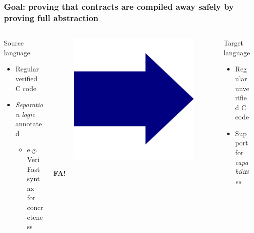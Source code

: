 \documentclass{beamer}
\begin{document}
\begin{frame}
\frametitle{Goal: proving that contracts are compiled away safely by proving full abstraction}
\begin{columns}%
\begin{column}{0.45\textwidth}
	\begin{block}{Source language}
	\begin{itemize}
	\item Regular verified C code
	\item \emph{Separation logic} annotated
		\begin{itemize}
		\item e.g. VeriFast syntax for concreteness
		\end{itemize}
	\end{itemize}
	\end{block}
\end{column}
\begin{column}{0.08\textwidth}
	\begin{figure}
	\includegraphics[width=0.8\linewidth]{BlueArrow}
	\end{figure}\vspace{-2em}
	\center \textbf{FA!}
\end{column}
\begin{column}{0.45\textwidth}
    \begin{block}{Target language}
	\begin{itemize}
	\item Regular unverified C code
	\item Support for \emph{capabilities}\\

\end{itemize}
\end{block}
\end{column}
\end{columns}
\end{frame}
\end{document}
